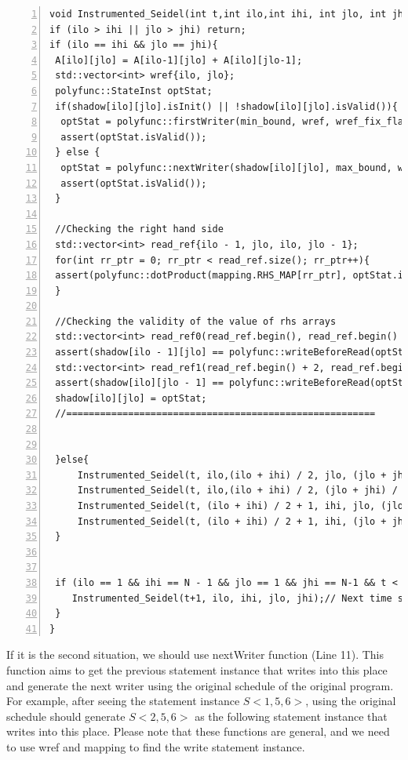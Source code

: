 \documentclass[letterpaper,12pt]{article}
\begin{document}
	
\begin{lstlisting}[caption={The instrumented code}, label={code:InstrumentedFunction}, numbers=left, captionpos=b, stepnumber=1]
void Instrumented_Seidel(int t,int ilo,int ihi, int jlo, int jhi){
if (ilo > ihi || jlo > jhi) return;
if (ilo == ihi && jlo == jhi){
 A[ilo][jlo] = A[ilo-1][jlo] + A[ilo][jlo-1];
 std::vector<int> wref{ilo, jlo};
 polyfunc::StateInst optStat;
 if(shadow[ilo][jlo].isInit() || !shadow[ilo][jlo].isValid()){
  optStat = polyfunc::firstWriter(min_bound, wref, wref_fix_flag, mapping.LHS_MAP);
  assert(optStat.isValid());
 } else {
  optStat = polyfunc::nextWriter(shadow[ilo][jlo], max_bound, wref, wref_fix_flag, mapping.LHS_MAP);
  assert(optStat.isValid());
 }

 //Checking the right hand side
 std::vector<int> read_ref{ilo - 1, jlo, ilo, jlo - 1};
 for(int rr_ptr = 0; rr_ptr < read_ref.size(); rr_ptr++){
 assert(polyfunc::dotProduct(mapping.RHS_MAP[rr_ptr], optStat.instance) + read_const[rr_ptr] == read_ref[rr_ptr]);
 }
 
 //Checking the validity of the value of rhs arrays
 std::vector<int> read_ref0(read_ref.begin(), read_ref.begin() + 2);
 assert(shadow[ilo - 1][jlo] == polyfunc::writeBeforeRead(optStat, min_bound, read_ref0, wref_fix_flag, mapping.LHS_MAP));
 std::vector<int> read_ref1(read_ref.begin() + 2, read_ref.begin() + 4);
 assert(shadow[ilo][jlo - 1] == polyfunc::writeBeforeRead(optStat, min_bound, read_ref1, wref_fix_flag, mapping.LHS_MAP));
 shadow[ilo][jlo] = optStat;
 //=======================================================
 
 
 }else{
	 Instrumented_Seidel(t, ilo,(ilo + ihi) / 2, jlo, (jlo + jhi)/2); //Top-Left
	 Instrumented_Seidel(t, ilo,(ilo + ihi) / 2, (jlo + jhi) / 2 + 1,jhi); //Top-Right
	 Instrumented_Seidel(t, (ilo + ihi) / 2 + 1, ihi, jlo, (jlo + jhi) / 2); //Bottom-Left
	 Instrumented_Seidel(t, (ilo + ihi) / 2 + 1, ihi, (jlo + jhi)/2 + 1, jhi); //Bottom-Right
 }
 

 if (ilo == 1 && ihi == N - 1 && jlo == 1 && jhi == N-1 && t < (T - 1)){ 
 	Instrumented_Seidel(t+1, ilo, ihi, jlo, jhi);// Next time step
 }
}
	\end{lstlisting}
	
	 If it is the second situation, we should use nextWriter function (Line 11). This function aims to get the previous statement instance that writes into this place and generate the next writer using the original schedule of the original program. For example, after seeing the statement instance $S<1,5,6>$, using the original schedule should generate $S<2,5,6>$ as the following statement instance that writes into this place. Please note that these functions are general, and we need to use wref and mapping to find the write statement instance. 
\end{document}
